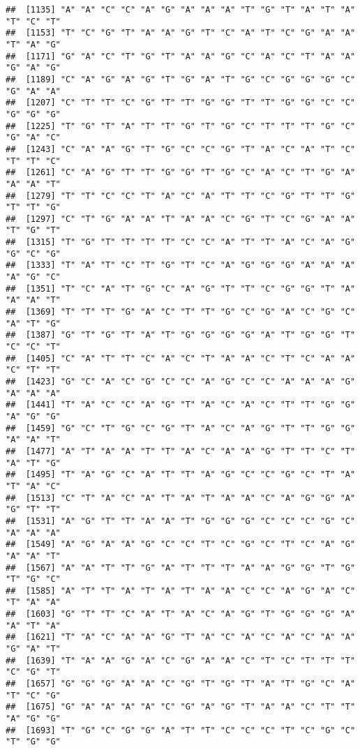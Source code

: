 \documentclass[
]{article}
\begin{document}
\begin{verbatim}
##  [1135] "A" "A" "C" "C" "A" "G" "A" "A" "A" "T" "G" "T" "A" "T" "A" "T" "C" "T"
##  [1153] "T" "C" "G" "T" "A" "A" "G" "T" "C" "A" "T" "C" "G" "A" "A" "T" "A" "G"
##  [1171] "G" "A" "C" "T" "G" "T" "A" "A" "G" "C" "A" "C" "T" "A" "A" "G" "A" "G"
##  [1189] "C" "A" "G" "A" "G" "T" "G" "A" "T" "G" "C" "G" "G" "G" "C" "G" "A" "A"
##  [1207] "C" "T" "T" "C" "G" "T" "T" "G" "G" "T" "T" "G" "G" "C" "C" "G" "G" "G"
##  [1225] "T" "G" "T" "A" "T" "T" "G" "T" "G" "C" "T" "T" "T" "G" "C" "G" "A" "C"
##  [1243] "C" "A" "A" "G" "T" "G" "C" "C" "G" "T" "A" "C" "A" "T" "C" "T" "T" "C"
##  [1261] "C" "A" "G" "T" "T" "G" "G" "T" "G" "C" "A" "C" "T" "G" "A" "A" "A" "T"
##  [1279] "T" "T" "C" "C" "T" "A" "C" "A" "T" "T" "C" "G" "T" "T" "G" "T" "T" "G"
##  [1297] "C" "T" "G" "A" "A" "T" "A" "A" "C" "G" "T" "C" "G" "A" "A" "T" "G" "T"
##  [1315] "T" "G" "T" "T" "T" "T" "C" "C" "A" "T" "T" "A" "C" "A" "G" "G" "C" "G"
##  [1333] "T" "A" "T" "C" "T" "G" "T" "C" "A" "G" "G" "G" "A" "A" "A" "A" "G" "C"
##  [1351] "T" "C" "A" "T" "G" "C" "A" "G" "T" "T" "C" "G" "G" "T" "A" "A" "A" "T"
##  [1369] "T" "T" "T" "G" "A" "C" "T" "T" "G" "C" "G" "A" "C" "G" "C" "A" "T" "G"
##  [1387] "G" "T" "G" "T" "A" "T" "G" "G" "G" "G" "A" "T" "G" "G" "T" "C" "C" "T"
##  [1405] "C" "A" "T" "T" "C" "A" "C" "T" "A" "A" "C" "T" "C" "A" "A" "C" "T" "T"
##  [1423] "G" "C" "A" "C" "G" "C" "C" "A" "G" "C" "C" "A" "A" "A" "G" "A" "A" "A"
##  [1441] "T" "A" "C" "C" "A" "G" "T" "A" "C" "A" "C" "T" "T" "G" "G" "A" "G" "G"
##  [1459] "G" "C" "T" "G" "C" "G" "T" "A" "C" "A" "G" "T" "T" "G" "G" "A" "A" "T"
##  [1477] "A" "T" "A" "A" "T" "T" "A" "C" "A" "A" "G" "T" "T" "C" "T" "A" "T" "G"
##  [1495] "T" "A" "G" "C" "A" "T" "T" "A" "G" "C" "C" "G" "C" "T" "A" "T" "A" "C"
##  [1513] "C" "T" "A" "C" "A" "T" "A" "T" "A" "A" "C" "A" "G" "G" "A" "G" "T" "T"
##  [1531] "A" "G" "T" "T" "A" "A" "T" "G" "G" "G" "C" "C" "C" "G" "C" "A" "A" "A"
##  [1549] "A" "G" "A" "A" "G" "C" "C" "T" "C" "G" "C" "T" "C" "A" "G" "A" "A" "T"
##  [1567] "A" "A" "T" "T" "G" "A" "T" "T" "T" "A" "A" "G" "G" "T" "G" "T" "G" "C"
##  [1585] "A" "T" "T" "A" "T" "A" "T" "A" "A" "C" "C" "A" "G" "A" "C" "T" "A" "A"
##  [1603] "G" "T" "T" "C" "A" "T" "A" "C" "A" "G" "T" "G" "G" "G" "A" "A" "T" "A"
##  [1621] "T" "A" "C" "A" "A" "G" "T" "A" "C" "A" "C" "A" "C" "A" "A" "G" "A" "T"
##  [1639] "T" "A" "A" "G" "A" "C" "G" "A" "A" "C" "T" "C" "T" "T" "T" "C" "G" "T"
##  [1657] "G" "G" "G" "A" "A" "C" "G" "T" "G" "T" "A" "T" "G" "C" "A" "T" "C" "G"
##  [1675] "G" "A" "A" "A" "A" "C" "G" "A" "G" "T" "A" "A" "C" "T" "T" "A" "G" "G"
##  [1693] "T" "G" "C" "G" "G" "A" "T" "T" "C" "C" "C" "T" "C" "G" "C" "T" "G" "G"

\end{verbatim}
\end{document}
